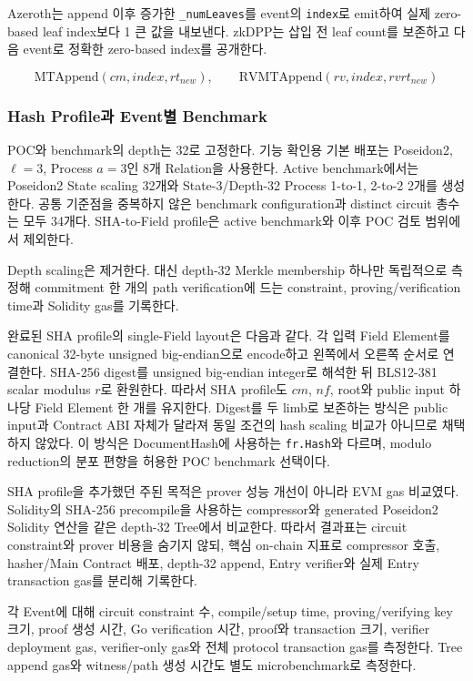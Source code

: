 \documentclass[11pt]{extarticle}
\begin{document}
Azeroth는 append 이후 증가한 \texttt{\_numLeaves}를 event의 \texttt{index}로
emit하여 실제 zero-based leaf index보다 1 큰 값을 내보낸다. zkDPP는 삽입 전 leaf
count를 보존하고 다음 event로 정확한 zero-based index를 공개한다.

\[
\mathrm{MTAppend}(cm,index,rt_{new}),
\qquad
\mathrm{RVMTAppend}(rv,index,rvrt_{new})
\]

\subsubsection{Hash Profile과 Event별 Benchmark}

POC와 benchmark의 depth는 32로 고정한다. 기능 확인용 기본 배포는 Poseidon2,
$\ell=3$, Process $a=3$인 8개 Relation을 사용한다. Active benchmark에서는 Poseidon2
State scaling 32개와 State-3/Depth-32 Process 1-to-1, 2-to-2 2개를 생성한다.
공통 기준점을 중복하지 않은 benchmark configuration과 distinct circuit 총수는 모두
34개다. SHA-to-Field profile은 active benchmark와 이후 POC 검토 범위에서 제외한다.

Depth scaling은 제거한다. 대신 depth-32 Merkle membership 하나만 독립적으로 측정해
commitment 한 개의 path verification에 드는 constraint, proving/verification time과
Solidity gas를 기록한다.

완료된 SHA profile의 single-Field layout은 다음과 같다. 각 입력 Field Element를 canonical
32-byte unsigned big-endian으로 encode하고 왼쪽에서 오른쪽 순서로 연결한다. SHA-256
digest를 unsigned big-endian integer로 해석한 뒤 BLS12-381 scalar modulus $r$로 환원한다.
따라서 SHA profile도 $cm$, $nf$, root와 public input 하나당 Field Element 한 개를
유지한다. Digest를 두 limb로 보존하는 방식은 public input과 Contract ABI 자체가 달라져
동일 조건의 hash scaling 비교가 아니므로 채택하지 않았다. 이 방식은 DocumentHash에
사용하는 \texttt{fr.Hash}와 다르며, modulo reduction의 분포 편향을 허용한 POC benchmark
선택이다.

SHA profile을 추가했던 주된 목적은 prover 성능 개선이 아니라 EVM gas 비교였다. Solidity의
SHA-256 precompile을 사용하는 compressor와 generated Poseidon2 Solidity 연산을 같은
depth-32 Tree에서 비교한다. 따라서 결과표는 circuit constraint와 prover 비용을 숨기지
않되, 핵심 on-chain 지표로 compressor 호출, hasher/Main Contract 배포, depth-32 append,
Entry verifier와 실제 Entry transaction gas를 분리해 기록한다.

각 Event에 대해 circuit constraint 수, compile/setup time, proving/verifying key
크기, proof 생성 시간, Go verification 시간, proof와 transaction 크기, verifier
deployment gas, verifier-only gas와 전체 protocol transaction gas를 측정한다.
Tree append gas와 witness/path 생성 시간도 별도 microbenchmark로 측정한다.
\end{document}

